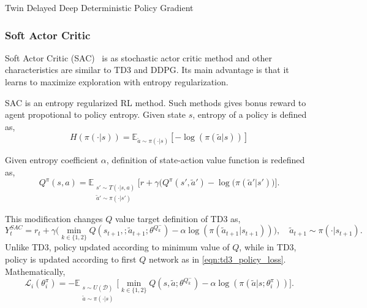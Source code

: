 \begin{algorithm}
{{			
		}
	}
	\caption{Twin Delayed Deep Deterministic Policy Gradient}
	\label{alg:td3}
\end{algorithm}


\subsubsection{Soft Actor Critic}
Soft Actor Critic (SAC)~\cite{haarnoja_soft_2018} is as stochastic actor critic method and other characteristics are similar to TD3 and DDPG. Its main advantage is that it learns to maximize exploration with entropy regularization. 

SAC is an entropy regularized RL method. Such methods gives bonus reward to agent propotional to policy entropy. Given state $s$, entropy of a policy is defined as,
\begin{equation}
\label{eqn:policy_entropy}
H(\pi(\cdot|s)) = \mathbb{E}_{\widetilde{a}\sim\pi(\cdot|s)}[-\log(\pi(\widetilde{a}|s))]
\end{equation}

Given entropy coefficient $\alpha$, definition of state-action value function is redefined as,
\begin{equation}
\label{eqn:q_dfn_entreg}
Q^{\pi}(s,a) = \mathbb{E}_{\substack{s'\sim T(\cdot|s,a)\\\widetilde{a}'\sim \pi(\cdot|s')} } \Big[r + \gamma \Big(Q^{\pi}(s',\widetilde{a}') -\log(\pi(\widetilde{a}'|s') \Big) \Big]. %
\end{equation}

This modification changes $Q$ value target definition of TD3 as,
\begin{equation}
\label{eqn:q_target_sac}
Y_t^{SAC} = r_t + \gamma \Big(\min_{k\in\{1,2\}} Q(s_{t+1}, ;\widetilde{a}_{t+1};\theta^{Q_k^-}) -\alpha\log(\pi(\widetilde{a}_{t+1}|s_{t+1})) \Big), \quad \widetilde{a}_{t+1} \sim \pi(\cdot|s_{t+1}).
\end{equation}
Unlike TD3, policy updated according to minimum value of $Q$, while in TD3, policy is updated according to first $Q$ network as in \eqref{eqn:td3_policy_loss}. Mathematically, 
\begin{equation}
\label{eqn:sac_policy_loss}
\mathcal{L}_i(\theta^\pi_i) = - \mathbb{E}_{\substack{s \sim U(\mathcal{D})\\\widetilde{a} \sim \pi(\cdot|s)}} \Big[ \min_{k\in\{1,2\}} Q(s, \widetilde{a};\theta^{Q_k^-}) - \alpha\log(\pi(\widetilde{a}|s;\theta^\pi_i)) \Big].
\end{equation}

